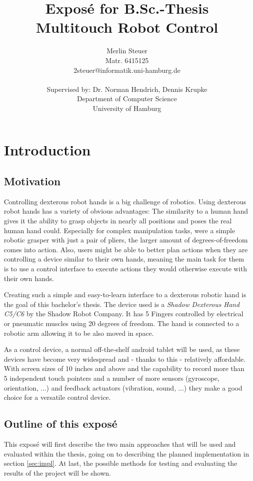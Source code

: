 \documentclass[a4paper]{article}
\title{Exposé for B.Sc.-Thesis \\
Multitouch Robot Control}
\author{Merlin Steuer \\ Matr. 6415125 \\ 2steuer@informatik.uni-hamburg.de \\
\\ Supervised by: Dr. Norman Hendrich, Dennis Krupke \\ 
Department of Computer Science \\ 
University of Hamburg}
\begin{document}
\maketitle

\tableofcontents

\pagebreak

\section{Introduction}
\subsection{Motivation}
Controlling dexterous robot hands is a big challenge of robotics. Using dexterous robot hands has a variety of obvious advantages: The similarity to a human hand gives it the ability to grasp objects in nearly all positions and poses the real human hand could. Especially for complex manipulation tasks, were a simple robotic grasper with just a pair of pliers, the larger amount of degrees-of-freedom comes into action. Also, users might be able to better plan actions when they are controlling a device similar to their own hands, meaning the main task for them is to use a control interface to execute actions they would otherwise execute with their own hands.

Creating such a simple and easy-to-learn interface to a dexterous robotic hand is the goal of this bachelor's thesis. The device used is a \textit{Shadow Dexterous Hand C5/C6} by the Shadow Robot Company. It has 5 Fingers controlled by electrical or pneumatic muscles using 20 degrees of freedom\cite{web/robothand/spec}. The hand is connected to a robotic arm allowing it to be also moved in space.

As a control device, a normal off-the-shelf android tablet will be used, as these devices have become very widespread and - thanks to this - relatively affordable. With screen sizes of 10 inches and above and the capability to record more than 5 independent touch pointers and a number of more sensors (gyroscope, orientation, ...) and feedback actuators (vibration, sound, ...) they make a good choice for a versatile control device.

\subsection{Outline of this exposé}

This exposé will first describe the two main approaches that will be used and evaluated within the thesis, going on to describing the planned implementation in section \ref{sec:impl}. At last, the possible methods for testing and evaluating the results of the project will be shown.
\end{document}
